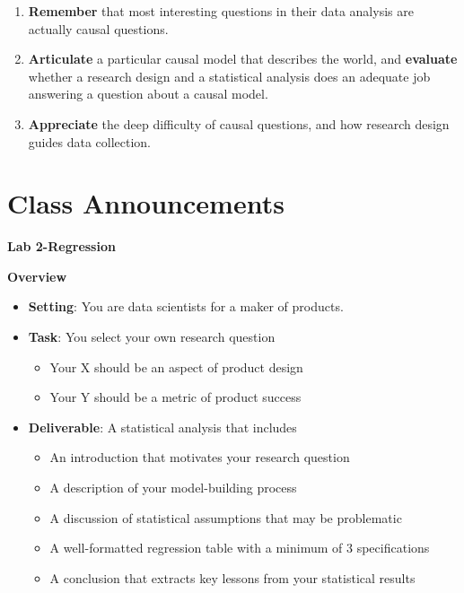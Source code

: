 \documentclass[
]{book}
\providecommand{\tightlist}{%
  \setlength{\itemsep}{0pt}\setlength{\parskip}{0pt}}
\theoremstyle{definition}
\theoremstyle{definition}
\theoremstyle{definition}
\theoremstyle{definition}
\theoremstyle{remark}
\begin{document}
\begin{enumerate}
\def\labelenumi{\arabic{enumi}.}
\tightlist
\item
  \textbf{Remember} that most interesting questions in their data analysis are actually causal questions.
\item
  \textbf{Articulate} a particular causal model that describes the world, and \textbf{evaluate} whether a research design and a statistical analysis does an adequate job answering a question about a causal model.
\item
  \textbf{Appreciate} the deep difficulty of causal questions, and how research design guides data collection.
\end{enumerate}

\section{Class Announcements}\label{class-announcements-9}

\textbf{Lab 2-Regression}

\textbf{Overview}

\begin{itemize}
\tightlist
\item
  \textbf{Setting}: You are data scientists for a maker of products.
\item
  \textbf{Task}: You select your own research question

  \begin{itemize}
  \tightlist
  \item
    Your X should be an aspect of product design
  \item
    Your Y should be a metric of product success
  \end{itemize}
\item
  \textbf{Deliverable}: A statistical analysis that includes

  \begin{itemize}
  \tightlist
  \item
    An introduction that motivates your research question
  \item
    A description of your model-building process
  \item
    A discussion of statistical assumptions that may be problematic
  \item
    A well-formatted regression table with a minimum of 3 specifications
  \item
    A conclusion that extracts key lessons from your statistical results
  \end{itemize}
\end{itemize}
\end{document}
